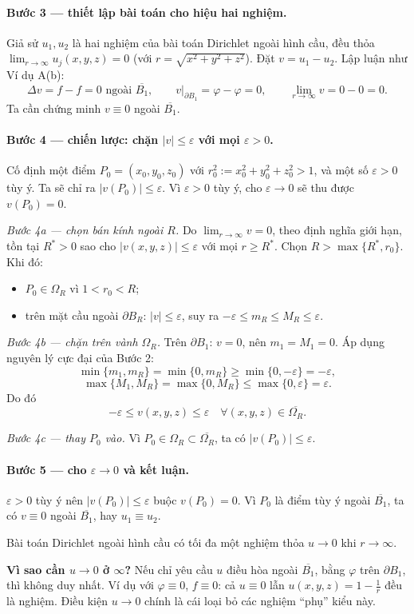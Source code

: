 \paragraph{Bước 3 --- thiết lập bài toán cho hiệu hai nghiệm.}
Giả sử $u_1,u_2$ là hai nghiệm của bài toán Dirichlet ngoài hình cầu, đều thỏa $\lim_{r\to\infty}u_j(x,y,z)=0$ (với $r=\sqrt{x^2+y^2+z^2}$). Đặt $v=u_1-u_2$. Lập luận như Ví dụ A(b):
\[
\Delta v=f-f=0 \text{ ngoài }\overline{B_1},\qquad
v\big|_{\partial B_1}=\varphi-\varphi=0,\qquad
\lim_{r\to\infty}v=0-0=0.
\]
Ta cần chứng minh $v\equiv 0$ ngoài $\overline{B_1}$.

\paragraph{Bước 4 --- chiến lược: chặn $|v|\le\varepsilon$ với mọi $\varepsilon>0$.}
Cố định một điểm $P_0=(x_0,y_0,z_0)$ với $r_0^2:=x_0^2+y_0^2+z_0^2>1$, và một số $\varepsilon>0$ tùy ý. Ta sẽ chỉ ra $|v(P_0)|\le\varepsilon$. Vì $\varepsilon>0$ tùy ý, cho $\varepsilon\to 0$ sẽ thu được $v(P_0)=0$.

\emph{Bước 4a --- chọn bán kính ngoài $R$.}
Do $\lim_{r\to\infty}v=0$, theo định nghĩa giới hạn, tồn tại $R^*>0$ sao cho $|v(x,y,z)|\le\varepsilon$ với mọi $r\ge R^*$. Chọn $R>\max\{R^*,r_0\}$. Khi đó:
\begin{itemize}
  \item $P_0\in\Omega_R$ vì $1<r_0<R$;
  \item trên mặt cầu ngoài $\partial B_R$: $|v|\le\varepsilon$, suy ra
  $-\varepsilon\le m_R\le M_R\le\varepsilon$.
\end{itemize}

\emph{Bước 4b --- chặn trên vành $\Omega_R$.}
Trên $\partial B_1$: $v=0$, nên $m_1=M_1=0$. Áp dụng nguyên lý cực đại của Bước 2:
\[
\min\{m_1,m_R\}=\min\{0,m_R\}\ge \min\{0,-\varepsilon\}=-\varepsilon,
\]
\[
\max\{M_1,M_R\}=\max\{0,M_R\}\le \max\{0,\varepsilon\}=\varepsilon.
\]
Do đó
\[
-\varepsilon\le v(x,y,z)\le\varepsilon\quad\forall(x,y,z)\in\overline{\Omega_R}.
\]

\emph{Bước 4c --- thay $P_0$ vào.}
Vì $P_0\in\Omega_R\subset\overline{\Omega_R}$, ta có $|v(P_0)|\le\varepsilon$.

\paragraph{Bước 5 --- cho $\varepsilon\to 0$ và kết luận.}
$\varepsilon>0$ tùy ý nên $|v(P_0)|\le\varepsilon$ buộc $v(P_0)=0$. Vì $P_0$ là điểm tùy ý ngoài $\overline{B_1}$, ta có $v\equiv 0$ ngoài $\overline{B_1}$, hay $u_1\equiv u_2$.

\begin{nhobox}
Bài toán Dirichlet ngoài hình cầu có tối đa một nghiệm thỏa $u\to 0$ khi $r\to\infty$.
\end{nhobox}

\begin{luuybox}
\textbf{Vì sao cần $u\to 0$ ở $\infty$?} Nếu chỉ yêu cầu $u$ điều hòa ngoài $\overline{B_1}$, bằng $\varphi$ trên $\partial B_1$, thì không duy nhất. Ví dụ với $\varphi\equiv 0$, $f\equiv 0$: cả $u\equiv 0$ lẫn $u(x,y,z)=1-\tfrac{1}{r}$ đều là nghiệm. Điều kiện $u\to 0$ chính là cái loại bỏ các nghiệm ``phụ'' kiểu này.
\end{luuybox}
